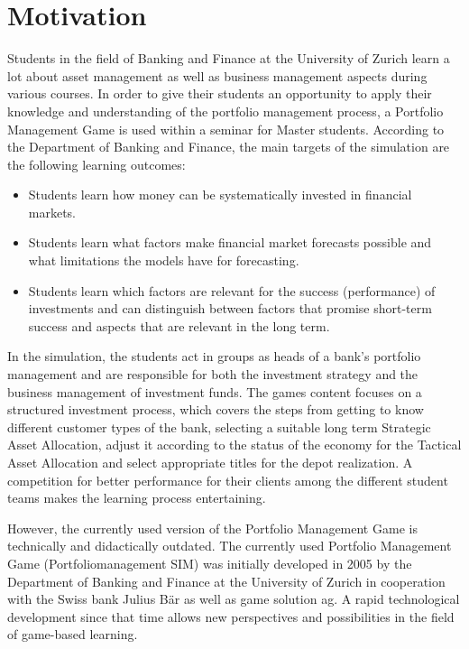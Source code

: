 \section{Motivation}
Students in the field of Banking and Finance at the University of Zurich learn a lot about asset management as well as business management aspects during various courses. In order to give their students an opportunity to apply their knowledge and understanding of the portfolio management process, a Portfolio Management Game is used within a seminar for Master students. According to the Department of Banking and Finance, the main targets of the simulation are the following learning outcomes:
\begin{itemize}
  \item Students learn how money can be systematically invested in financial markets.
  \item Students learn what factors make financial market forecasts possible and what limitations the models have for forecasting.
  \item Students learn which factors are relevant for the success (performance) of investments and can distinguish between factors that promise short-term success and aspects that are relevant in the long term.
\end{itemize}

In the simulation, the students act in groups as heads of a bank’s portfolio management and are responsible for both the investment strategy and the business management of investment funds. The games content focuses on a structured investment process, which covers the steps from getting to know different customer types of the bank, selecting a suitable long term Strategic Asset Allocation, adjust it according to the status of the economy for the Tactical Asset Allocation and select appropriate titles for the depot realization. A competition for better performance for their clients among the different student teams makes the learning process entertaining.

However, the currently used version of the Portfolio Management Game is technically and didactically outdated. The currently used Portfolio Management Game (Portfoliomanagement SIM) was initially developed in 2005 by the Department of Banking and Finance at the University of Zurich in cooperation with the Swiss bank Julius Bär as well as game solution ag. A rapid technological development since that time allows new perspectives and possibilities in the field of game-based learning.

